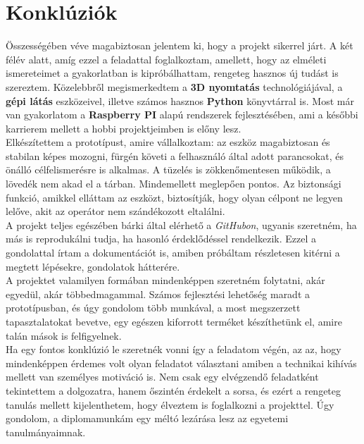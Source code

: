 \documentclass[12pt,a4paper]{article}
\begin{document}
\section{Konklúziók}
Összességében véve magabiztosan jelentem ki, hogy a projekt sikerrel járt. A két félév alatt, amíg ezzel a feladattal foglalkoztam, amellett, hogy az elméleti ismereteimet a gyakorlatban is kipróbálhattam, rengeteg hasznos új tudást is szereztem. Közelebbről megismerkedtem a \textbf{3D nyomtatás} technológiájával, a \textbf{gépi látás} eszközeivel, illetve számos hasznos \textbf{Python} könyvtárral is. Most már van gyakorlatom a \textbf{Raspberry PI} alapú rendszerek fejlesztésében, ami a későbbi karrierem mellett a hobbi projektjeimben is előny lesz.\\

Elkészítettem a prototípust, amire vállalkoztam: az eszköz magabiztosan és stabilan képes mozogni, fürgén követi a felhasználó által adott parancsokat, és önálló célfelismerésre is alkalmas. A tüzelés is zökkenőmentesen működik, a lövedék nem akad el a tárban. Mindemellett meglepően pontos. Az biztonsági funkció, amikkel elláttam az eszközt, biztosítják, hogy olyan célpont ne legyen lelőve, akit az operátor nem szándékozott eltalálni. \\

A projekt teljes egészében bárki által elérhető a \textsl{GitHubon}, ugyanis szeretném, ha más is reprodukálni tudja, ha hasonló érdeklődéssel rendelkezik. Ezzel a gondolattal írtam a dokumentációt is, amiben próbáltam részletesen kitérni a megtett lépésekre, gondolatok hátterére.\\

A projektet valamilyen formában mindenképpen szeretném folytatni, akár egyedül, akár többedmagammal. Számos fejlesztési lehetőség maradt a prototípusban, és úgy gondolom több munkával, a most megszerzett tapasztalatokat bevetve, egy egészen kiforrott terméket készíthetünk el, amire talán mások is felfigyelnek.\\

Ha egy fontos konklúzió le szeretnék vonni így a feladatom végén, az az, hogy mindenképpen érdemes volt olyan feladatot választani amiben a technikai kihívás mellett van személyes motiváció is. Nem csak egy elvégzendő feladatként tekintettem a dolgozatra, hanem őszintén érdekelt a sorsa, és ezért a rengeteg tanulás mellett kijelenthetem, hogy élveztem is foglalkozni a projekttel. Úgy gondolom, a diplomamunkám egy méltó lezárása lesz az egyetemi tanulmányaimnak. 
\end{document}
